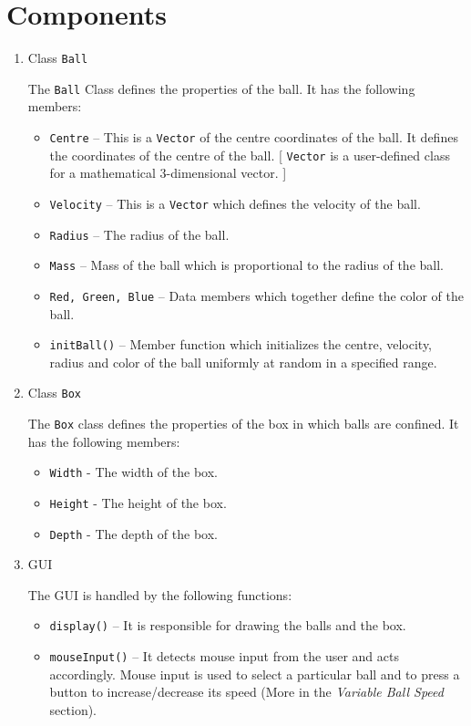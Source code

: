 \documentclass[]{article}
\newcommand{\ty}[1]{\texttt{#1}}
\begin{document}
\section{Components}
\begin{enumerate}
\item Class \texttt{Ball}
\begin{flushleft}
The \texttt{Ball} Class defines the properties of the ball. It has the following members:
\begin{itemize}
\item \texttt{Centre} -- This is a \texttt{Vector} of the centre coordinates of the ball. It defines the coordinates of the centre of the ball. [ \texttt{Vector} is a user-defined class for a mathematical 3-dimensional vector. ]
\item \ty{Velocity} -- This is a \ty{Vector} which defines the velocity of the ball.
\item \ty{Radius} -- The radius of the ball.
\item \ty{Mass} -- Mass of the ball which is proportional to the radius of the ball.
\item \ty{Red, Green, Blue} -- Data members which together define the color of the ball.
\item \ty{initBall()} -- Member function which initializes the centre, velocity, radius and color of the ball uniformly at random in a specified range.
\end{itemize}
\end{flushleft}
\item Class \ty{Box}
\begin{flushleft}
The \ty{Box} class defines the properties of the box in which balls are confined. It has the following members:
\begin{itemize}
\item \ty{Width} - The width of the box.
\item \ty{Height} - The height of the box.
\item \ty{Depth} - The depth of the box.
\end{itemize}
\end{flushleft}
\item GUI
\begin{flushleft}
The GUI is handled by the following functions:
\begin{itemize}
\item \ty{display()} -- It is responsible for drawing the balls and the box.
\item \ty{mouseInput()} -- It detects mouse input from the user and acts accordingly. Mouse input is used to select a particular ball and to press a button to increase/decrease its speed (More in the \emph{Variable Ball Speed} section).

\end{itemize}
\end{flushleft}
\end{enumerate}
\end{document}
